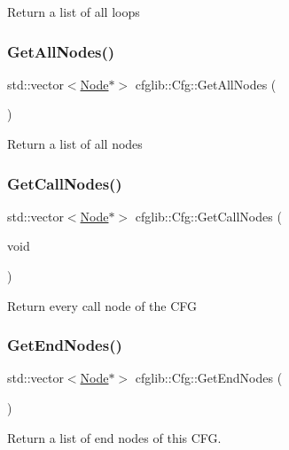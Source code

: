 Return a list of all loops \mbox{\label{classcfglib_1_1Cfg_a0a5b78a124083bb3419d10968de0554a}} 
\subsubsection{\texorpdfstring{Get\+All\+Nodes()}{GetAllNodes()}}
{\footnotesize\ttfamily std\+::vector$<$\hyperlink{classcfglib_1_1Node}{Node}$\ast$$>$ cfglib\+::\+Cfg\+::\+Get\+All\+Nodes (\begin{DoxyParamCaption}{ }\end{DoxyParamCaption})}

Return a list of all nodes \mbox{\label{classcfglib_1_1Cfg_a54ab52821050574fa12eca0eb87f7271}} 
\subsubsection{\texorpdfstring{Get\+Call\+Nodes()}{GetCallNodes()}}
{\footnotesize\ttfamily std\+::vector$<$\hyperlink{classcfglib_1_1Node}{Node}$\ast$$>$ cfglib\+::\+Cfg\+::\+Get\+Call\+Nodes (\begin{DoxyParamCaption}\item[{void}]{ }\end{DoxyParamCaption})}

Return every call node of the C\+FG \mbox{\label{classcfglib_1_1Cfg_aa94cd8bb8d1d33cdcd6d1a7e0b244370}} 
\subsubsection{\texorpdfstring{Get\+End\+Nodes()}{GetEndNodes()}}
{\footnotesize\ttfamily std\+::vector$<$\hyperlink{classcfglib_1_1Node}{Node}$\ast$$>$ cfglib\+::\+Cfg\+::\+Get\+End\+Nodes (\begin{DoxyParamCaption}{ }\end{DoxyParamCaption})}

Return a list of end nodes of this C\+FG. \mbox{\label{classcfglib_1_1Cfg_ac87776adfdc86881d01c4ea529004c1a}} 
